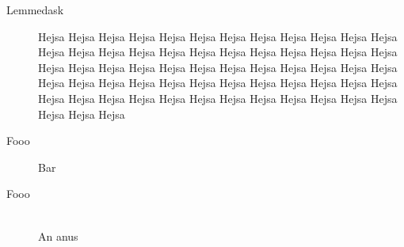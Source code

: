 
\begin{description}
    \item[Lemmedask] Hejsa Hejsa Hejsa Hejsa Hejsa Hejsa Hejsa Hejsa Hejsa Hejsa Hejsa Hejsa Hejsa Hejsa Hejsa Hejsa Hejsa Hejsa Hejsa Hejsa Hejsa Hejsa Hejsa Hejsa Hejsa Hejsa Hejsa Hejsa Hejsa Hejsa Hejsa Hejsa Hejsa Hejsa Hejsa Hejsa Hejsa Hejsa Hejsa Hejsa Hejsa Hejsa Hejsa Hejsa Hejsa Hejsa Hejsa Hejsa Hejsa Hejsa Hejsa Hejsa Hejsa Hejsa Hejsa Hejsa Hejsa Hejsa Hejsa Hejsa Hejsa Hejsa Hejsa
    \item[Fooo] Bar
    \item[Fooo] \mbox{}\\ An anus
\end{description}
